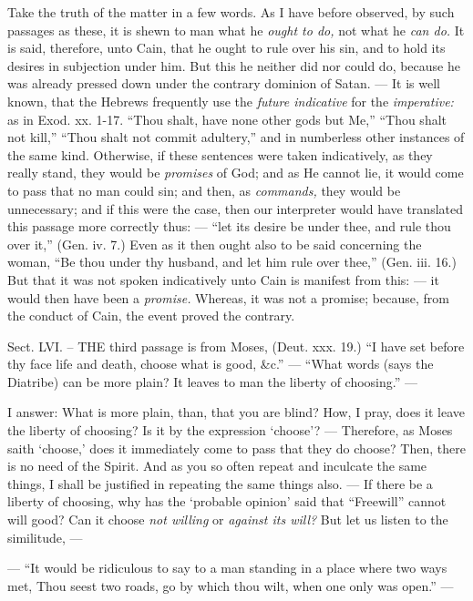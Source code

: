 Take the truth of the matter in a few words. As I have before observed, by such passages as these, it is shewn to man what he \emph{ought to do, }not what he \emph{can do. }It is said, therefore, unto Cain, that he ought to rule over his sin, and to hold its desires in subjection under him. But this he neither did nor could do, because he was already pressed down under the contrary dominion of Satan. — It is well known, that the Hebrews frequently use the \emph{future indicative }for the \emph{imperative: }as in Exod. xx. 1-17. “Thou shalt, have none other gods but Me,” “Thou shalt not kill,” “Thou shalt not commit adultery,” and in numberless other instances of the same kind. Otherwise, if these sentences were taken indicatively, as they really stand, they would be \emph{promises }of God; and as He cannot lie, it would come to pass that no man could sin; and then, as \emph{commands, }they would be unnecessary; and if this were the case, then our interpreter would have translated this passage more correctly thus: — “let its desire be under thee, and rule thou over it,” (Gen. iv. 7.) Even as it then ought also to be said concerning the woman, “Be thou under thy husband, and let him rule over thee,” (Gen. iii. 16.) But that it was not spoken indicatively unto Cain is manifest from this: — it would then have been a \emph{promise. }Whereas, it was not a promise; because, from the conduct of Cain, the event proved the contrary.


Sect. LVI. – THE third passage is from Moses, (Deut. xxx. 19.) “I have set before thy face life and death, choose what is good, \&c.” — “What words (says the Diatribe) can be more plain? It leaves to man the liberty of choosing.” —

I answer: What is more plain, than, that you are blind? How, I pray, does it leave the liberty of choosing? Is it by the expression ‘choose’? — Therefore, as Moses saith ‘choose,’ does it immediately come to pass that they do choose? Then, there is no need of the Spirit. And as you so often repeat and inculcate the same things, I shall be justified in repeating the same things also. — If there be a liberty of choosing, why has the ‘probable opinion’ said that “Freewill” cannot will good? Can it choose \emph{not willing }or \emph{against its will? }But let us listen to the similitude, —

— “It would be ridiculous to say to a man standing in a place where two ways met, Thou seest two roads, go by which thou wilt, when one only was open.” —

